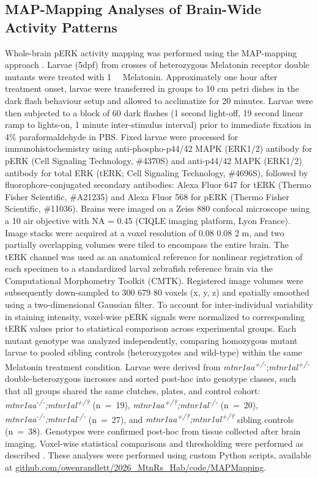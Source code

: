 \documentclass[9.5pt]{RandlettLab_elife}            %
\begin{document}
\subsection{MAP-Mapping Analyses of Brain-Wide Activity Patterns}
Whole-brain pERK activity mapping was performed using the MAP-mapping approach \citep{Randlett2015}.
Larvae (5dpf) from crosses of heterozygous Melatonin receptor double mutants were treated with \SI{1}{\micro\Molar} Melatonin.
Approximately one hour after treatment onset, larvae were transferred in groups to 10 cm petri dishes in the dark flash behaviour setup and allowed to acclimatize for 20 minutes.
Larvae were then subjected to a block of 60 dark flashes (1 second light-off, 19 second linear ramp to lights-on, 1 minute inter-stimulus interval) prior to immediate fixation in 4\% paraformaldehyde in PBS.
Fixed larvae were processed for immunohistochemistry using anti-phospho-p44/42 MAPK (ERK1/2) antibody for pERK (Cell Signaling Technology, \#4370S) and anti-p44/42 MAPK (ERK1/2) antibody for total ERK (tERK; Cell Signaling Technology, \#4696S), followed by fluorophore-conjugated secondary antibodies: Alexa Fluor\texttrademark{} 647 for tERK (Thermo Fisher Scientific, \#A21235) and Alexa Fluor\texttrademark{} 568 for pERK (Thermo Fisher Scientific, \#11036).
Brains were imaged on a Zeiss 880 confocal microscope using a 10\texttimes{} air objective with NA = 0.45 (CIQLE imaging platform, Lyon France).
Image stacks were acquired at a voxel resolution of 0.08 \texttimes{} 0.08 \texttimes{} 2 \textmu m, and two partially overlapping volumes were tiled to encompass the entire brain.
The tERK channel was used as an anatomical reference for nonlinear registration of each specimen to a standardized larval zebrafish reference brain via the Computational Morphometry Toolkit (CMTK).
Registered image volumes were subsequently down-sampled to 300 \texttimes{} 679 \texttimes{} 80 voxels (x, y, z) and spatially smoothed using a two-dimensional Gaussian filter.
To account for inter-individual variability in staining intensity, voxel-wise pERK signals were normalized to corresponding tERK values prior to statistical comparison across experimental groups.
Each mutant genotype was analyzed independently, comparing homozygous mutant larvae to pooled sibling controls (heterozygotes and wild-type) within the same Melatonin treatment condition.
Larvae were derived from \emph{mtnr1aa\textsuperscript{+/-}};\emph{mtnr1al\textsuperscript{+/-}} double-heterozygous incrosses and sorted post-hoc into genotype classes, such that all groups shared the same clutches, plates, and control cohort: \emph{mtnr1aa\textsuperscript{-/-};mtnr1al\textsuperscript{+/?}} (n~=~19), \emph{mtnr1aa\textsuperscript{+/?};mtnr1al\textsuperscript{-/-}} (n~=~20), \emph{mtnr1aa\textsuperscript{-/-};mtnr1al\textsuperscript{-/-}} (n~=~27), and \emph{mtnr1aa\textsuperscript{+/?};mtnr1al\textsuperscript{+/?}} sibling controls (n~=~38).
Genotypes were confirmed post-hoc from tissue collected after brain imaging. 
Voxel-wise statistical comparisons and thresholding were performed as described \citep{Randlett2015}.
These analyses were performed using custom Python scripts, available at \href{https://github.com/owenrandlett/2026_MtnRs_Hab/tree/main/code/MAPMapping}{github.com/owenrandlett/2026\_MtnRs\_Hab/code/MAPMapping}.
\end{document}
